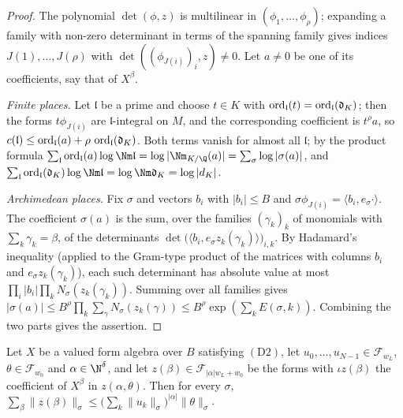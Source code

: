 \begin{proof}
The polynomial $\det(\phi,z)$ is multilinear in $(\phi_1,\dots,\phi_\rho)$; expanding a family with non-zero determinant in
terms of the spanning family gives indices $J(1),\dots,J(\rho)$ with $\det((\phi_{J(i)})_i,z)\ne0$. Let $a\ne0$ be one of its
coefficients, say that of $X^\beta$.

\emph{Finite places.} Let $\mathfrak l$ be a prime and choose $t\in K$ with $\operatorname{ord}_{\mathfrak l}(t)=\operatorname{ord}_{\mathfrak l}(\mathfrak
d_K)$; then the forms $t\phi_{J(i)}$ are $\mathfrak l$-integral on $M$, and the corresponding coefficient is $t^\rho a$, so
$c(\mathfrak l)\le\operatorname{ord}_{\mathfrak l}(a)+\rho\,\operatorname{ord}_{\mathfrak l}(\mathfrak d_K)$. Both terms vanish for almost all $\mathfrak
l$; by the product formula $\sum_{\mathfrak l}\ontooneord_{\mathfrak l}(a)\log\Nm\mathfrak l=\log|\Nm_{K/\Q}(a)|=\sum_\sigma\log|\sigma(a)|$,
and $\sum_{\mathfrak l}\ontooneord_{\mathfrak l}(\mathfrak d_K)\log\Nm\mathfrak l=\log\Nm\mathfrak d_K=\log|d_K|$.

\emph{Archimedean places.} Fix $\sigma$ and vectors $b_i$ with $|b_i|\le B$ and $\sigma\phi_{J(i)}=\langle b_i,e_\sigma\cdot\rangle$. The
coefficient $\sigma(a)$ is the sum, over the families $(\gamma_k)_k$ of monomials with $\sum_k\gamma_k=\beta$, of the determinants
$\det\bigl(\langle b_i,e_\sigma z_k(\gamma_k)\rangle\bigr)_{i,k}$. By Hadamard's inequality (applied to the Gram-type product of the
matrices with columns $b_i$ and $e_\sigma z_k(\gamma_k)$), each such determinant has absolute value at most
$\prod_i|b_i|\prod_kN_\sigma(z_k(\gamma_k))$. Summing over all families gives $|\sigma(a)|\le B^\rho\prod_k\sum_\gamma
N_\sigma(z_k(\gamma))\le B^\rho\exp(\sum_kE(\sigma,k))$. Combining the two parts gives the assertion.
\end{proof}

\begin{lemma}\label{pf:onto1:l1coef}
Let $X$ be a valued form algebra over $B$ satisfying $(\mathrm D2)$, let $u_0,\dots,u_{N-1}\in\mathcal F_{w_L}$, $\theta\in\mathcal
F_{w_0}$ and $\alpha\in\N^\delta$, and let $z(\beta)\in\mathcal F_{|\alpha|w_L+w_0}$ be the forms with $\iota z(\beta)$ the coefficient of
$X^\beta$ in $z(\alpha,\theta)$. Then for every $\sigma$,
$\sum_\beta\|z(\beta)\|_\sigma\le\bigl(\sum_k\|u_k\|_\sigma\bigr)^{|\alpha|}\|\theta\|_\sigma$.
\end{lemma}

